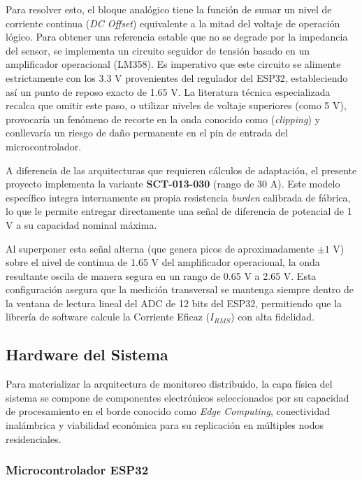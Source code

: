 
        Para resolver esto, el bloque analógico tiene la función de sumar un nivel de corriente continua (\textit{DC Offset}) equivalente a la mitad del voltaje de operación lógico. Para obtener una referencia estable que no se degrade por la impedancia del sensor, se implementa un circuito seguidor de tensión basado en un amplificador operacional (LM358). Es imperativo que este circuito se alimente estrictamente con los 3.3 V provenientes del regulador del ESP32, estableciendo así un punto de reposo exacto de 1.65 V. La literatura técnica especializada \cite{naylamp2023sct} recalca que omitir este paso, o utilizar niveles de voltaje superiores (como 5 V), provocaría un fenómeno de recorte en la onda conocido como (\textit{clipping}) y conllevaría un riesgo de daño permanente en el pin de entrada del microcontrolador.

        A diferencia de las arquitecturas que requieren cálculos de adaptación, el presente proyecto implementa la variante \textbf{SCT-013-030} (rango de 30 A). Este modelo específico integra internamente su propia resistencia \textit{burden} calibrada de fábrica, lo que le permite entregar directamente una señal de diferencia de potencial de 1 V a su capacidad nominal máxima.

        Al superponer esta señal alterna (que genera picos de aproximadamente $\pm 1$ V) sobre el nivel de continua de 1.65 V del amplificador operacional, la onda resultante oscila de manera segura en un rango de 0.65 V a 2.65 V. Esta configuración asegura que la medición transversal se mantenga siempre dentro de la ventana de lectura lineal del ADC de 12 bits del ESP32, permitiendo que la librería de software calcule la Corriente Eficaz ($I_{RMS}$) con alta fidelidad.
        
    \subsection{Hardware del Sistema}
        Para materializar la arquitectura de monitoreo distribuido, la capa física del sistema se compone de componentes electrónicos seleccionados por su capacidad de procesamiento en el borde conocido como \textit{Edge Computing}, conectividad inalámbrica y viabilidad económica para su replicación en múltiples nodos residenciales.

        \subsubsection{Microcontrolador ESP32}

